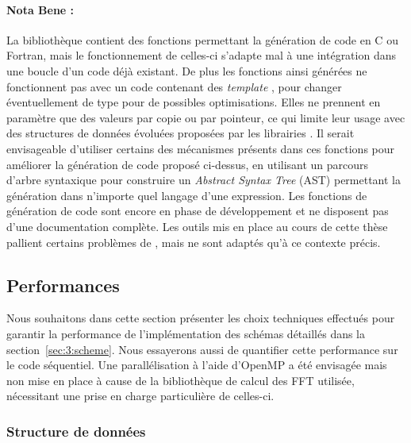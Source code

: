 \paragraph{Nota Bene :} La bibliothèque \sympy{} contient des fonctions permettant la génération de code en C ou Fortran, mais le fonctionnement de celles-ci s'adapte mal à une intégration dans une boucle d'un code déjà existant. De plus les fonctions ainsi générées ne fonctionnent pas avec un code contenant des \emph{template} \CC, pour changer éventuellement de type pour de possibles optimisations. Elles ne prennent en paramètre que des valeurs par copie ou par pointeur, ce qui limite leur usage avec des structures de données évoluées proposées par les librairies \CC. Il serait envisageable d'utiliser certains des mécanismes présents dans ces fonctions pour améliorer la génération de code proposé ci-dessus, en utilisant un parcours d'arbre syntaxique pour construire un \emph{Abstract Syntax Tree} (AST) permettant la génération dans n'importe quel langage d'une expression. Les fonctions \sympy{} de génération de code sont encore en phase de développement et ne disposent pas d'une documentation complète. Les outils mis en place au cours de cette thèse pallient certains problèmes de \sympy{}, mais ne sont adaptés qu'à ce contexte précis.

\subsection{Performances}

Nous souhaitons dans cette section présenter les choix techniques effectués pour garantir la performance de l'implémentation des schémas détaillés dans la section~\ref{sec:3:scheme}. Nous essayerons aussi de quantifier cette performance sur le code séquentiel. Une parallélisation à l'aide d'OpenMP a été envisagée mais non mise en place à cause de la bibliothèque de calcul des FFT utilisée, nécessitant une prise en charge particulière de celles-ci.

\subsubsection{Structure de données}

